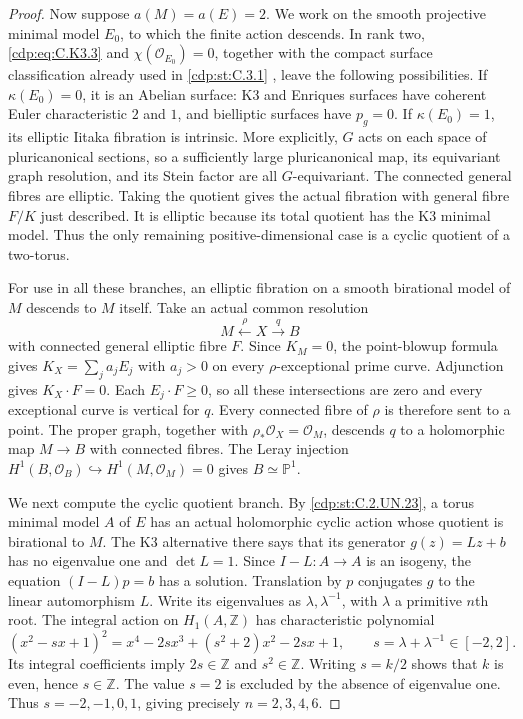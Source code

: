 \begin{proof}
Now suppose $a(M)=a(E)=2$. We work on the smooth
projective minimal model $E_0$, to which the finite
action descends. In rank two, \eqref{cdp:eq:C.K3.3} and
$\chi(\mathcal O_{E_0})=0$, together with the compact
surface classification already used in \ref{cdp:st:C.3.1}
\cite[Theorem~3.1]{Peters1990}, leave the following
possibilities. If $\kappa(E_0)=0$, it is an Abelian
surface: K3 and Enriques surfaces have coherent Euler
characteristic $2$ and $1$, and bielliptic surfaces have
$p_g=0$. If $\kappa(E_0)=1$, its elliptic Iitaka
fibration is intrinsic. More explicitly, $G$ acts on
each space of pluricanonical sections, so a sufficiently
large pluricanonical map, its equivariant graph resolution,
and its Stein factor are all $G$-equivariant. The
connected general fibres are elliptic. Taking the
quotient gives the actual fibration with general fibre
$F/K$ just described. It is elliptic because its total
quotient has the K3 minimal model. Thus the only
remaining positive-dimensional case is a cyclic quotient
of a two-torus.

For use in all these branches, an elliptic fibration on
a smooth birational model of $M$ descends to $M$ itself.
Take an actual common resolution
\[
                  M\xleftarrow{\rho}X\xrightarrow{q}B
                                                               \tag{C.K3.5}\label{cdp:eq:C.K3.5}
\]
with connected general elliptic fibre $F$. Since $K_M=0$,
the point-blowup formula gives
$K_X=\sum_j a_jE_j$ with $a_j>0$ on every
$\rho$-exceptional prime curve. Adjunction gives
$K_X\cdot F=0$. Each $E_j\cdot F\ge0$, so all these
intersections are zero and every exceptional curve is
vertical for $q$. Every connected fibre of $\rho$ is
therefore sent to a point. The proper graph, together
with $\rho_*\mathcal O_X=\mathcal O_M$, descends $q$
to a holomorphic map $M\to B$ with connected fibres.
The Leray injection
$H^1(B,\mathcal O_B)\hookrightarrow H^1(M,\mathcal O_M)=0$
gives $B\simeq\mathbb P^1$.

We next compute the cyclic quotient branch. By
\ref{cdp:st:C.2.UN.23}, a torus minimal model $A$ of $E$ has an
actual holomorphic cyclic action whose quotient is
birational to $M$. The K3 alternative there says that
its generator $g(z)=Lz+b$ has no eigenvalue one and
$\det L=1$. Since $I-L:A\to A$ is an isogeny, the
equation $(I-L)p=b$ has a solution. Translation by
$p$ conjugates $g$ to the linear automorphism $L$.
Write its eigenvalues as $\lambda,\lambda^{-1}$,
with $\lambda$ a primitive $n$th root. The integral
action on $H_1(A,\mathbb Z)$ has characteristic polynomial
\[
 (x^2-sx+1)^2
   =x^4-2sx^3+(s^2+2)x^2-2sx+1,
 \qquad s=\lambda+\lambda^{-1}\in[-2,2].
                                                               \tag{C.K3.6}\label{cdp:eq:C.K3.6}
\]
Its integral coefficients imply $2s\in\mathbb Z$
and $s^2\in\mathbb Z$. Writing $s=k/2$ shows that
$k$ is even, hence $s\in\mathbb Z$. The value $s=2$
is excluded by the absence of eigenvalue one.
Thus $s=-2,-1,0,1$, giving precisely
$n=2,3,4,6$.


\end{proof}
